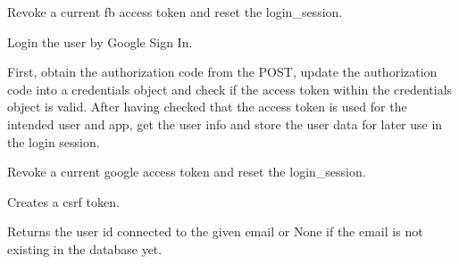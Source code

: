 \documentclass[letterpaper,10pt,english]{sphinxmanual}
\begin{document}

\begin{fulllineitems}
\label{application:application.fbdisconnect}
Revoke a current fb access token and reset the login\_session.

\end{fulllineitems}


\begin{fulllineitems}
\label{application:application.gconnect}
Login the user by Google Sign In.

First, obtain the authorization code from the POST, update
the authorization code into a credentials object and check
if the access token within the credentials object is valid.
After having checked that the access token is used for the 
intended user and app, get the user info and store the user
data for later use in the login session.

\end{fulllineitems}


\begin{fulllineitems}
\label{application:application.gdisconnect}
Revoke a current google access token and reset the login\_session.

\end{fulllineitems}


\begin{fulllineitems}
\label{application:application.generate_csrf_token}
Creates a csrf token.

\end{fulllineitems}


\begin{fulllineitems}
\label{application:application.getUserID}
Returns the user id connected to the given email
or None if the email is not existing in the
database yet.

\end{fulllineitems}
\end{document}
